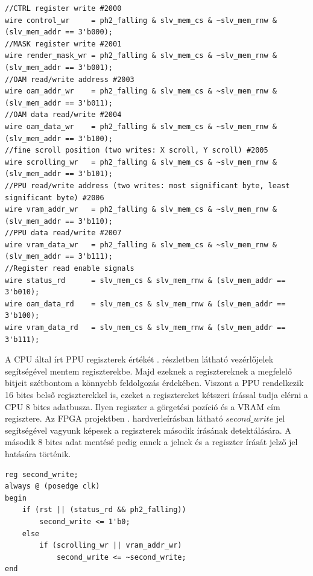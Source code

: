\begin{lstlisting}[caption={A CPU adatbusz feldolgozása (PPU vezérlőjelek)}, label={code:CPU-signals-decode}, style=prettyverilog]
//CTRL register write #2000
wire control_wr     = ph2_falling & slv_mem_cs & ~slv_mem_rnw & (slv_mem_addr == 3'b000);
//MASK register write #2001 
wire render_mask_wr = ph2_falling & slv_mem_cs & ~slv_mem_rnw & (slv_mem_addr == 3'b001);
//OAM read/write address #2003 
wire oam_addr_wr    = ph2_falling & slv_mem_cs & ~slv_mem_rnw & (slv_mem_addr == 3'b011);
//OAM data read/write #2004 
wire oam_data_wr    = ph2_falling & slv_mem_cs & ~slv_mem_rnw & (slv_mem_addr == 3'b100);
//fine scroll position (two writes: X scroll, Y scroll) #2005
wire scrolling_wr   = ph2_falling & slv_mem_cs & ~slv_mem_rnw & (slv_mem_addr == 3'b101);
//PPU read/write address (two writes: most significant byte, least significant byte) #2006
wire vram_addr_wr   = ph2_falling & slv_mem_cs & ~slv_mem_rnw & (slv_mem_addr == 3'b110);
//PPU data read/write #2007 
wire vram_data_wr   = ph2_falling & slv_mem_cs & ~slv_mem_rnw & (slv_mem_addr == 3'b111);
//Register read enable signals
wire status_rd      = slv_mem_cs & slv_mem_rnw & (slv_mem_addr == 3'b010);
wire oam_data_rd    = slv_mem_cs & slv_mem_rnw & (slv_mem_addr == 3'b100);
wire vram_data_rd   = slv_mem_cs & slv_mem_rnw & (slv_mem_addr == 3'b111);\end{lstlisting}

	A CPU által írt PPU regiszterek értékét . részletben látható vezérlőjelek segítségével mentem regiszterekbe. Majd ezeknek a regisztereknek a megfelelő bitjeit szétbontom a könnyebb feldolgozás érdekében. Viszont a PPU rendelkezik 16 bites belső regiszterekkel is, ezeket a regisztereket kétszeri írással tudja elérni a CPU 8 bites adatbusza. Ilyen regiszter a görgetési pozíció és a VRAM cím regisztere. Az FPGA projektben . hardverleírásban látható $second\_write$ jel segítségével vagyunk képesek a regiszterek második írásának detektálására. A második 8 bites adat mentésé pedig ennek a jelnek és a regiszter írását jelző jel hatására történik.

\begin{lstlisting}[caption={Cím és görgetés regiszterek második írásának figyelése}, label={code:second-write}, style=prettyverilog]
reg second_write;
always @ (posedge clk) 
begin
	if (rst || (status_rd && ph2_falling))
		second_write <= 1'b0;
	else
		if (scrolling_wr || vram_addr_wr)
			second_write <= ~second_write;
end\end{lstlisting}
	
